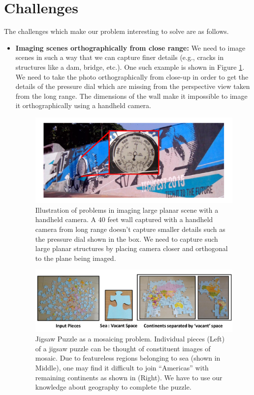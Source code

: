 \section{Challenges}
The challenges which make our problem interesting to solve are as follows. 
\begin{itemize}
  \item \textbf{Imaging scenes orthographically from close range:}
We need to image scenes in such a way that we can capture finer details
(e.g., cracks in structures like a dam, bridge, etc.). One such example is shown
in Figure \ref{fig:orthographicView}. We need to take the photo
orthographically from close-up in order to get the details of the pressure dial
which are missing from the perspective view taken from the long range. The
dimensions of the wall make it impossible to image it orthographically  using
a handheld camera. 

\begin{figure}[h!]
\centering
\includegraphics[width=0.98\linewidth]{figures/orthographicView}
\caption[Problems in imaging large scene using a handheld camera]{Illustration of
problems in imaging large planar scene with a handheld camera. A 40 feet wall
captured with a handheld camera from long range doesn't capture smaller details
such as the pressure dial shown in the box. We need to capture such large
planar structures by placing camera closer and orthogonal to the plane being imaged.}
\label{fig:orthographicView}
\end{figure}

\begin{figure}[h!]
\centering
\includegraphics[width=0.98\linewidth]{figures/vacantSpaces}
\caption[Jigsaw Puzzle as a mosaicing problem]{Jigsaw Puzzle as a mosaicing
problem. Individual pieces (Left) of a jigsaw puzzle can be thought of constituent images of mosaic. Due to featureless
regions belonging to sea (shown in Middle), one may find it difficult to join
``Americas'' with remaining continents as shown in (Right). We have to use
our knowledge about geography to complete the puzzle.}
\label{fig:vacantSpaces}
\end{figure}
  

\end{itemize}
